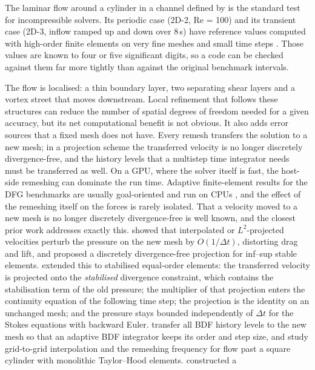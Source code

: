 \documentclass[preprint,12pt,number]{elsarticle}
\newcommand{\dt}{\Delta t}
\begin{document}
The laminar flow around a cylinder in a channel defined by \citet{schaefer1996} is the
standard test for incompressible solvers. Its periodic case (2D-2, Re = 100) and its
transient case (2D-3, inflow ramped up and down over $8\,$s) have reference values computed
with high-order finite elements on very fine meshes and small time steps
\citep{john2004,featflow}. Those values are known to four or five significant digits, so a
code can be checked against them far more tightly than against the original benchmark
intervals.

The flow is localised: a thin boundary layer, two separating shear layers and a vortex street
that moves downstream. Local refinement that follows these structures can reduce the number
of spatial degrees of freedom needed for a given accuracy, but its net computational benefit is
not obvious. It also adds
error sources that a fixed mesh does not have. Every remesh transfers the solution to a new
mesh; in a projection scheme the transferred velocity is no longer discretely divergence-free,
and the history levels that a multistep time integrator needs must be transferred as well.
On a GPU, where the solver itself is fast, the host-side remeshing can dominate the run time.
Adaptive finite-element results for the DFG benchmarks are usually goal-oriented and run on
CPUs \citep{braack2006,besier2012,bruchhaeuser2026}, and the effect of the remeshing itself on
the forces is rarely isolated. That a velocity moved to a new mesh is no longer discretely
divergence-free is well known, and the closest prior work addresses exactly this.
\citet{besierwollner2012} showed that interpolated or $L^2$-projected velocities perturb the
pressure on the new mesh by $O(1/\dt)$, distorting drag and lift, and proposed a discretely
divergence-free projection for inf--sup stable elements. \citet{braack2013} extended this to
stabilised equal-order elements: the transferred velocity is projected onto the
\emph{stabilised} divergence constraint, which contains the stabilisation term of the old
pressure; the multiplier of that projection enters the continuity equation of the following
time step; the projection is the identity on an unchanged mesh; and the pressure stays bounded
independently of $\dt$ for the Stokes equations with backward Euler. \citet{muller2019} transfer
all BDF history levels to the new mesh so that an adaptive BDF integrator keeps its order and
step size, and study grid-to-grid interpolation and the remeshing frequency for flow past a
square cylinder with monolithic Taylor--Hood elements. \citet{di2005} constructed a
\end{document}
